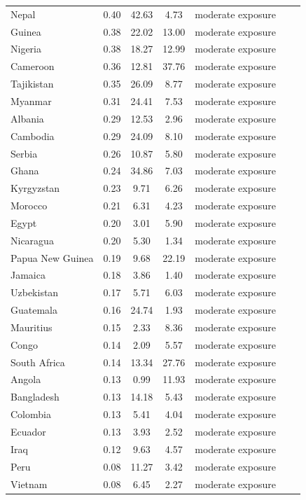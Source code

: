 \documentclass[fleqn,10pt,twocolumn]{wlscirep}
\begin{document}
\begin{longtable}{lrccccc}
	Nepal & 0.40 & 42.63 & 4.73 & moderate exposure \\
	Guinea & 0.38 & 22.02 & 13.00 & moderate exposure \\
	Nigeria & 0.38 & 18.27 & 12.99 & moderate exposure \\
	Cameroon & 0.36 & 12.81 & 37.76 & moderate exposure \\
	Tajikistan & 0.35 & 26.09 & 8.77 & moderate exposure \\
	Myanmar & 0.31 & 24.41 & 7.53 & moderate exposure \\
	Albania & 0.29 & 12.53 & 2.96 & moderate exposure \\
	Cambodia & 0.29 & 24.09 & 8.10 & moderate exposure \\
	Serbia & 0.26 & 10.87 & 5.80 & moderate exposure \\
	Ghana & 0.24 & 34.86 & 7.03 & moderate exposure \\
	Kyrgyzstan & 0.23 & 9.71 & 6.26 & moderate exposure \\
	Morocco & 0.21 & 6.31 & 4.23 & moderate exposure \\
	Egypt & 0.20 & 3.01 & 5.90 & moderate exposure \\
	Nicaragua & 0.20 & 5.30 & 1.34 & moderate exposure \\
	Papua New Guinea & 0.19 & 9.68 & 22.19 & moderate exposure \\
	Jamaica & 0.18 & 3.86 & 1.40 & moderate exposure \\
	Uzbekistan & 0.17 & 5.71 & 6.03 & moderate exposure \\
	Guatemala & 0.16 & 24.74 & 1.93 & moderate exposure \\
	Mauritius & 0.15 & 2.33 & 8.36 & moderate exposure \\
	Congo & 0.14 & 2.09 & 5.57 & moderate exposure \\
	South Africa & 0.14 & 13.34 & 27.76 & moderate exposure \\
	Angola & 0.13 & 0.99 & 11.93 & moderate exposure \\
	Bangladesh & 0.13 & 14.18 & 5.43 & moderate exposure \\
	Colombia & 0.13 & 5.41 & 4.04 & moderate exposure \\
	Ecuador & 0.13 & 3.93 & 2.52 & moderate exposure \\
	Iraq & 0.12 & 9.63 & 4.57 & moderate exposure \\
	Peru & 0.08 & 11.27 & 3.42 & moderate exposure \\
	Vietnam & 0.08 & 6.45 & 2.27 & moderate exposure \\

\end{longtable}
\end{document}
